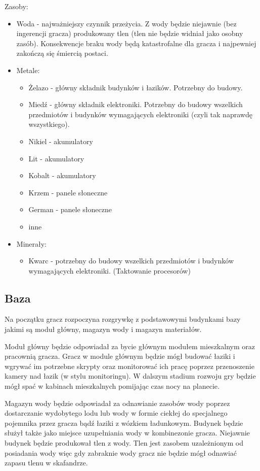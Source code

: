 \documentclass[a4paper,12pt]{article}
\begin{document}
Zasoby:
\begin{itemize}
	\item Woda - najważniejszy czynnik przeżycia. Z wody będzie niejawnie (bez ingerencji gracza) produkowany tlen (tlen nie będzie widniał jako osobny zasób). Konsekwencje braku wody będą katastrofalne dla gracza i najpewniej zakończą się śmiercią postaci.
	\item Metale:
	\begin{itemize}
		\item Żelazo - główny składnik budynków i łazików. Potrzebny do budowy.
		\item Miedź - główny składnik elektroniki. Potrzebny do budowy wszelkich przedmiotów i budynków wymagających elektroniki (czyli tak naprawdę wszystkiego).
		\item Nikiel - akumulatory
		\item Lit - akumulatory
		\item Kobalt - akumulatory
		\item Krzem - panele słoneczne
		\item German - panele słoneczne
		\item inne
	\end{itemize}
	\item Minerały:
	\begin{itemize}
		\item Kwarc - potrzebny do budowy wszelkich przedmiotów i budynków wymagających elektroniki. (Taktowanie procesorów)
	\end{itemize}
\end{itemize}
\subsection{Baza}
Na początku gracz rozpoczyna rozgrywkę z podstawowymi budynkami bazy jakimi są moduł główny, magazyn wody i magazyn materiałów.

Moduł główny będzie odpowiadał za bycie głównym modułem mieszkalnym oraz pracownią gracza. Gracz w module głównym będzie mógł budować łaziki i wgrywać im potrzebne skrypty oraz monitorować ich pracę poprzez przenoszenie kamery nad łazik (w stylu monitoringu). W dalszym stadium rozwoju gry będzie mógł spać w kabinach mieszkalnych pomijając czas nocy na planecie.

Magazyn wody będzie odpowiadał za odnawianie zasobów wody poprzez dostarczanie wydobytego lodu lub wody w formie ciekłej do specjalnego pojemnika przez gracza bądź łaziki z wózkiem ładunkowym. Budynek będzie służył także jako miejsce uzupełniania wody w kombinezonie gracza. Niejawnie budynek będzie produkował tlen z wody. Tlen jest zasobem uzależnionym od posiadania wody więc gdy zabraknie wody gracz nie będzie mógł odnawiać zapasu tlenu w skafandrze.
\end{document}
